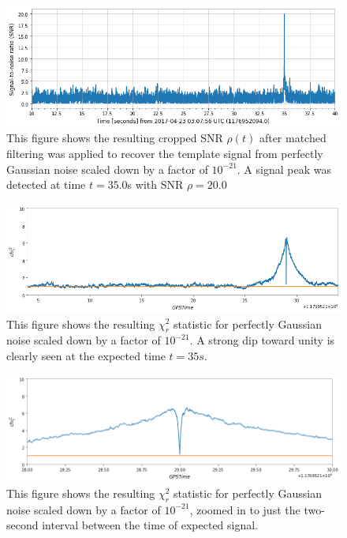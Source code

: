 \documentclass[preprint,
letterpaper,
 amsmath,amssymb,
 aps,
]{revtex4-2}
\begin{document}
\begin{widetext}
\begin{figure}[t]
\includegraphics[width = .9\textwidth]{gaussian -21 template 1.png}
\caption{This figure shows the resulting cropped SNR $\rho(t)$ after matched filtering was applied to recover the template signal from perfectly Gaussian noise scaled down by a factor of $10^{-21}$. A signal peak was detected at time $t = 35.0$s with SNR $\rho = 20.0$}
\centering
\end{figure} 

\begin{figure}[t]
\includegraphics[width = .9\textwidth]{chi2 gaussian zoomed.png}
\caption{This figure shows the resulting $\chi^2_r$ statistic for perfectly Gaussian noise scaled down by a factor of $10^{-21}$. A strong dip toward unity is clearly seen at the expected time $t=35s$.}
\centering
\end{figure} 

\begin{figure}[t]
\includegraphics[width = .9\textwidth]{chi2 gaussian.png}
\caption{This figure shows the resulting $\chi^2_r$ statistic for perfectly Gaussian noise scaled down by a factor of $10^{-21}$, zoomed in to just the two-second interval between the time of expected signal.}
\centering
\end{figure} 


\end{widetext}
\end{document}
